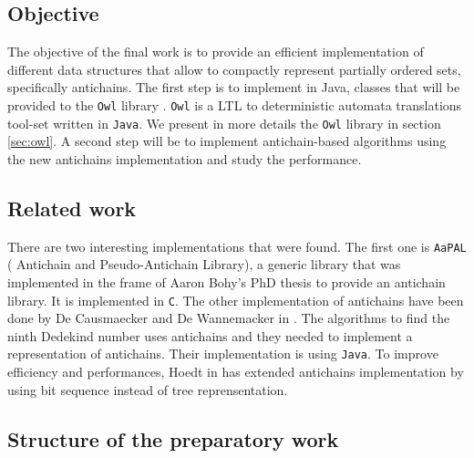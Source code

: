 \documentclass[11pt,a4paper]{article}
\theoremstyle{definition}
\begin{document}

\subsection{Objective}

The objective of the final work
is to provide an efficient implementation of different
data structures that allow to compactly
represent partially ordered sets, specifically antichains.
The first step is to implement in Java, classes that will be provided to
the \texttt{Owl} library \cite{owl}.
\texttt{Owl} is a LTL to deterministic automata translations tool-set written
in \texttt{Java}. We present in more details
the \texttt{Owl} library in section \ref{sec:owl}.
A second step will be to implement
antichain-based algorithms using the new antichains implementation and
study the performance.

\subsection{Related work}

There are two interesting implementations that were found.
The first one is \texttt{AaPAL} (
Antichain and Pseudo-Antichain Library), a generic
library that was implemented in the frame of
Aaron Bohy's PhD thesis \cite{bohy_phd}
to provide an antichain library. It is implemented in \texttt{C}.
The other implementation of antichains
have been done
by De Causmaecker and De Wannemacker in \cite{causemaecker1}. The algorithms
to find the ninth Dedekind number uses antichains and they needed to
implement a representation of antichains. Their implementation is using
\texttt{Java}.
To improve efficiency and performances, Hoedt in \cite{hoedt} has extended
\cite{causemaecker1} antichains implementation by using bit sequence
instead of tree reprensentation.

\subsection{Structure of the preparatory work}
\end{document}
